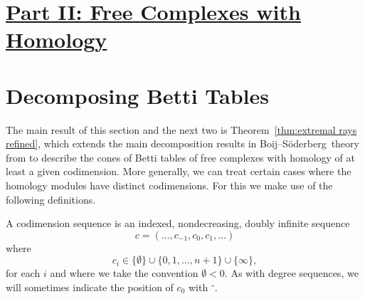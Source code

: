 \documentclass[12pt]{amsart}
\theoremstyle{definition}
\theoremstyle{remark}
\newcommand{\cc}{c}
\newcommand{\defi}[1]{\textsf{#1}} %
\newcommand{\zp}{\circ}
\newcommand{\nothing}{\emptyset}
\def\BS{Boij--S\"oderberg~}
\begin{document}


\section*{\underline{{Part II: Free Complexes with Homology}}}
\section{Decomposing Betti Tables}\label{sec:refined}
The main result of this section and the next two is Theorem~\ref{thm:extremal rays refined},
which extends the main decomposition results in \BS theory from \cites{eis-schrey1,boij-sod2}
to describe the cones of Betti tables of free complexes with  homology of at least a given codimension. More generally, we can treat certain cases where the homology modules have distinct codimensions. For this we make use of the following definitions.


A \defi{codimension sequence} is an indexed, nondecreasing,
doubly infinite sequence
$$
\cc=(\dots, c_{-1}, c_{0}, c_{1}, \dots )
$$
where  
$$
c_{i}\in \{\nothing\} \cup \{0,1,\dots,n+1\}\cup \{\infty\},
$$
for each $i$ and where we take the convention $\nothing<0$. As with degree sequences,
we will sometimes indicate the position of $c_{0}$ with $^{\circ}$.
\end{document}
